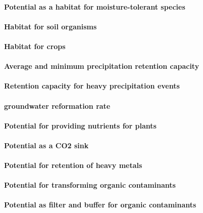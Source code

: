 \documentclass[preprint,12pt,authoryear]{elsarticle}
\begin{document}
\paragraph{Potential as a habitat for moisture-tolerant species}

\paragraph{Habitat for soil organisms}

\paragraph{Habitat for crops}

\paragraph{Average and minimum precipitation retention capacity}

\paragraph{Retention capacity for heavy precipitation events}
 
 
\paragraph{groundwater reformation rate}


\paragraph{Potential for providing nutrients for plants}

\paragraph{Potential as a CO2 sink}

\paragraph{Potential for retention of heavy metals}

\paragraph{Potential for transforming organic contaminants}

\paragraph{Potential as filter and buffer for organic contaminants}
\end{document}
